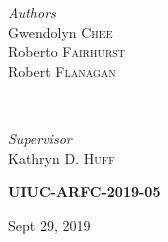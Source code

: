 \documentclass[11pt]{article}
\begin{document}
\begin{titlepage}
\begin{minipage}{0.6\textwidth}
        \end{minipage}

    \vspace{0.2cm}
    \HRule
    \vspace{0.5cm}


    \begin{minipage}{0.4\textwidth}
        \begin{flushleft}
            \large
            \textit{Authors}\\
                Gwendolyn \textsc{Chee}\\
                Roberto \textsc{Fairhurst}\\
                Robert \textsc{Flanagan}\\
        \end{flushleft}
    \end{minipage}
    ~
    \begin{minipage}{0.4\textwidth}
        \begin{flushright}
            \large
            \textit{Supervisor}\\
            Kathryn D. \textsc{Huff} %
        \end{flushright}
    \end{minipage}


    \vspace{1cm}
    \textsc{\LARGE\bfseries UIUC-ARFC-2019-05} %
    \vspace{0.5cm}


    \vspace{0.5cm} %
    {\large Sept 29, 2019} %
    \vspace{0.5cm}


\end{titlepage}
\end{document}
